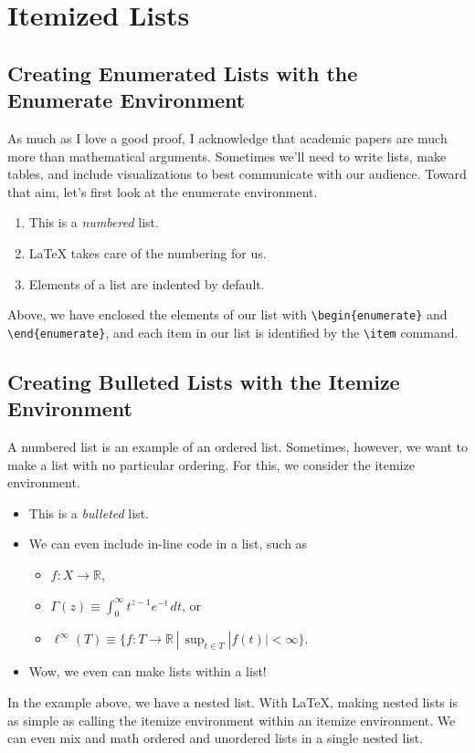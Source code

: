 \documentclass[12pt]{article}	%
\begin{document}
\newpage
\section{Itemized Lists}

\subsection{Creating Enumerated Lists with the Enumerate Environment}

As much as I love a good proof, I acknowledge that academic papers are much more than mathematical arguments. Sometimes we'll need to write lists, make tables, and include visualizations to best communicate with our audience. Toward that aim, let's first look at the enumerate environment.
	\begin{enumerate}
		\item This is a {\it numbered} list.
		\item \LaTeX{} takes care of the numbering for us.
		\item Elements of a list are indented by default.
	\end{enumerate}
Above, we have enclosed the elements of our list with \verb!\begin{enumerate}! and \verb!\end{enumerate}!, and each item in our list is identified by the \verb!\item! command.

\subsection{Creating Bulleted Lists with the Itemize Environment}

A numbered list is an example of an ordered list. Sometimes, however, we want to make a list with no particular ordering. For this, we consider the itemize environment.
	\begin{itemize}
		\item This is a {\it bulleted} list.
		\item We can even include in-line code in a list, such as
		\begin{itemize}
			\item $f : X \to \mathbb{R}$,
			\item $\Gamma(z) \equiv \int_0^\infty t^{z - 1} e^{-t} \, dt$, or
			\item $\ell^\infty(T) \equiv \{ f : T \to \mathbb{R} \, | \, \sup_{t \in T} | f(t) | < \infty \}$.
		\end{itemize}
		\item Wow, we even can make lists within a list!
	\end{itemize}
In the example above, we have a nested list. With \LaTeX{}, making nested lists is as simple as calling the itemize environment within an itemize environment. We can even mix and math ordered and unordered lists in a single nested list.
\end{document}
